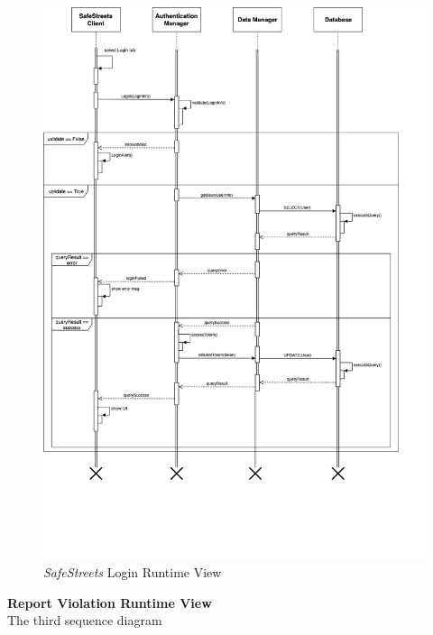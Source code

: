 \documentclass{article}
\begin{document}
	\begin{figure}[H]
			\centering
			\includegraphics[scale=0.35]{Images/Diagrams/Runtime/login_runtime.png}
			\caption{{\it SafeStreets} Login Runtime View}
	\end{figure}
	\pagebreak
	\noindent	
	{\bf Report Violation Runtime View} \\
	The third sequence diagram \\
\end{document}

